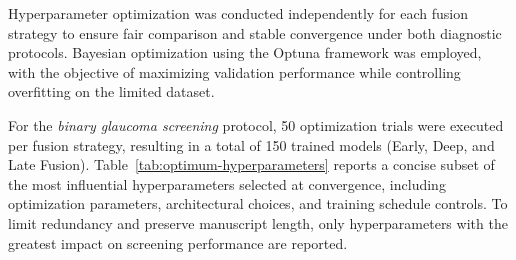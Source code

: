 \documentclass[preprint,12pt]{elsarticle}
\begin{document}
Hyperparameter optimization was conducted independently for each fusion strategy to ensure fair comparison and stable convergence under both diagnostic protocols. Bayesian optimization using the Optuna framework was employed, with the objective of maximizing validation performance while controlling overfitting on the limited dataset.

For the \emph{binary glaucoma screening} protocol, 50 optimization trials were executed per fusion strategy, resulting in a total of 150 trained models (Early, Deep, and Late Fusion). Table~\ref{tab:optimum-hyperparameters} reports a concise subset of the most influential hyperparameters selected at convergence, including optimization parameters, architectural choices, and training schedule controls. To limit redundancy and preserve manuscript length, only hyperparameters with the greatest impact on screening performance are reported.
\end{document}

